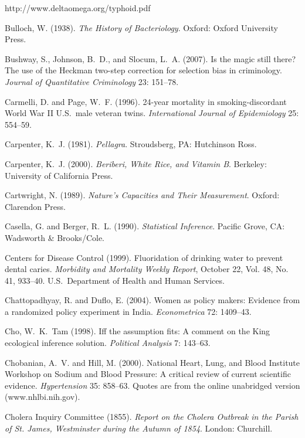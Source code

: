 \noindent \hskip 10pt
http://www.deltaomega.org/typhoid.pdf

\smallskip\noindent
Bulloch, W. (1938).
{\it The History of Bacteriology\/}.
Oxford: Oxford University Press.

\smallskip\noindent
Bushway, S., Johnson, B.~D., and Slocum, L.~A. (2007).
Is the magic still there? The use of the Heckman two-step correction for selection bias in criminology.
{\it Journal of Quantitative Criminology\/} 23: 151--78.

\smallskip\noindent
Carmelli, D. and Page, W.~F. (1996).
24-year mortality in smok\-ing-dis\-cor\-dant World War II
U.S.~male veteran twins.
{\it International Journal of Epidemiology\/} 25: 554--59.

\smallskip\noindent
Carpenter, K.~J. (1981).
{\it Pellagra\/}.
Stroudsberg, PA: Hutchinson Ross.

\smallskip\noindent
Carpenter, K.~J. (2000).
{\it Beriberi, White Rice, and Vitamin B\/}.
Berkeley: University of California Press.

\smallskip\noindent
Cartwright, N. (1989).
{\it Nature's Capacities and Their Measurement\/}.
Oxford: Clarendon Press.

\smallskip\noindent
Casella, G. and Berger, R.~L. (1990).
{\it Statistical Inference\/}.
Pacific Grove, CA: Wadsworth \& Brooks/Cole.

\smallskip\noindent
Centers for Disease Control (1999).
Fluoridation of drinking water to prevent dental caries.
{\it Morbidity and Mortality Weekly Report\/}, October 22, Vol. 48, No. 41, 933--40.
U.S.~Department of Health and Human Services.

\smallskip\noindent
Chattopadhyay, R. and Duflo, E. (2004).
Women as policy makers: Evidence from a randomized policy experiment in India.
{\it Econometrica\/} 72: 1409--43.

\smallskip\noindent
Cho, W.~K.~Tam (1998).
Iff the assumption fits: A comment on the King ecological inference solution.
{\it Political Analysis\/} 7: 143--63.

\smallskip\noindent
Chobanian, A.~V. and Hill, M. (2000).
National Heart, Lung, and Blood Institute Workshop on Sodium and Blood Pressure:
A critical review of current scientific evidence.
{\it Hypertension\/} 35: 858--63.
Quotes are from the online unabridged version (www.nhlbi.nih.gov).

\smallskip\noindent
Cholera Inquiry Committee (1855).
{\it Report on the Cholera Outbreak in the Parish of St. James, Westminster during the Autumn of 1854\/}.
London: Chur\-chill.

